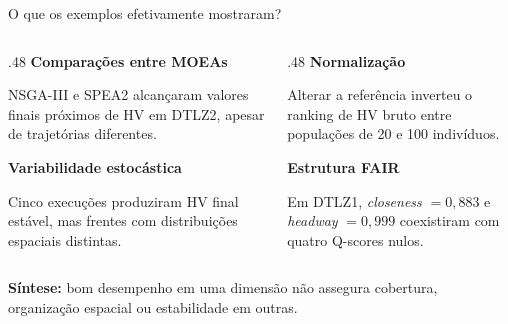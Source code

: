 \begin{frame}{O que os exemplos efetivamente mostraram?}
\begin{columns}[T,onlytextwidth]
\begin{column}{.48\textwidth}
\textbf{Comparações entre MOEAs}\par\smallskip
NSGA-III e SPEA2 alcançaram valores finais próximos de HV em DTLZ2, apesar de trajetórias diferentes.
\par\bigskip
\textbf{Variabilidade estocástica}\par\smallskip
Cinco execuções produziram HV final estável, mas frentes com distribuições espaciais distintas.
\end{column}
\begin{column}{.48\textwidth}
\textbf{Normalização}\par\smallskip
Alterar a referência inverteu o ranking de HV bruto entre populações de 20 e 100 indivíduos.
\par\bigskip
\textbf{Estrutura FAIR}\par\smallskip
Em DTLZ1, \emph{closeness} $=0{,}883$ e \emph{headway} $=0{,}999$ coexistiram com quatro Q-scores nulos.
\end{column}
\end{columns}
\vspace{.26cm}
\textbf{Síntese:} bom desempenho em uma dimensão não assegura cobertura, organização espacial ou estabilidade em outras.
\end{frame}

